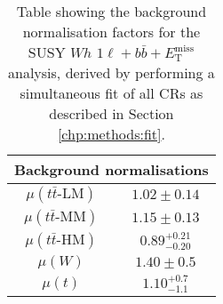 \begin{table}[h!]
    \centering
    \begin{tabular}{cc}
        \hline
        \multicolumn{2}{c}{Background normalisations} \\
        \hline
        $\mu(t\bar{t}\textrm{-LM})$ & $1.02\pm0.14$ \\
        $\mu(t\bar{t}\textrm{-MM})$ & $1.15\pm0.13$ \\
        $\mu(t\bar{t}\textrm{-HM})$ & $0.89^{+0.21}_{-0.20}$ \\
        $\mu(W)$ & $1.40\pm0.5$ \\
        $\mu(t)$ & $1.10^{+0.7}_{-1.1}$ \\
        \hline
        
    \end{tabular}
    \caption[Background normalisation factors]{Table showing the background normalisation factors for the SUSY $Wh$ $1\ell + b\bar{b} + E_{\textrm{T}}^{\textrm{miss}}$ analysis, derived by performing a simultaneous fit of all CRs as described in Section \ref{chp:methods:fit}.}
    \label{tab:1Lbbrun2:norms}
\end{table}